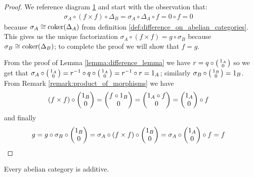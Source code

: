 \begin{figure}[h]
  
  \caption{}
  \label{diagram:sigma}
\end{figure}

\begin{proof}
  We reference diagram \ref{diagram:sigma} and start with the observation that:
  \begin{align*}
    \sigma_A\circ(f\times f)\circ\Delta_B = \sigma_A\circ\Delta_A\circ f = 0\circ f = 0
  \end{align*}
  because \(\sigma_A\cong\operatorname{coker}(\Delta_A)\) from definition \ref{def:difference_on_abelian_categories}. This gives us the unique factorization \(\sigma_A\circ(f\times f) = g\circ\sigma_B\) because \(\sigma_B\cong\operatorname{coker}(\Delta_B)\); to complete the proof we will show that \(f = g\).

  From the proof of Lemma \ref{lemma:difference_lemma} we have \(r = q\circ\left(\begin{smallmatrix}1_A\\ 0\end{smallmatrix}\right)\) so we get that \(\sigma_A\circ\left(\begin{smallmatrix}1_A\\ 0\end{smallmatrix}\right) = r^{-1}\circ q\circ\left(\begin{smallmatrix}1_A\\ 0\end{smallmatrix}\right) = r^{-1}\circ r = 1_A\); similarly \(\sigma_B\circ\left(\begin{smallmatrix}1_B\\ 0\end{smallmatrix}\right) = 1_B\).
  From Remark \ref{remark:product_of_morphisms} we have
  \begin{align*}
    (f\times f)\circ\begin{pmatrix}1_B\\ 0\end{pmatrix} = \begin{pmatrix}f\circ 1_B\\ 0\end{pmatrix} = \begin{pmatrix}1_A\circ f\\ 0\end{pmatrix} = \begin{pmatrix}1_A\\ 0\end{pmatrix}\circ f
  \end{align*}
  and finally
  \begin{align*}
    g = g\circ\sigma_B\circ\begin{pmatrix}1_B\\ 0\end{pmatrix} = \sigma_A\circ(f\times f)\circ\begin{pmatrix}1_B\\ 0\end{pmatrix} = \sigma_A\circ\begin{pmatrix}1_A\\ 0\end{pmatrix}\circ f = f
  \end{align*}
\end{proof}

\begin{theorem}
  \label{teo:additivity_of_abelian_categories}
  Every abelian category is additive.
\end{theorem}

\begin{figure}[h]
  
  \caption{}
  \label{diagram:abelian_additivity}
\end{figure}


